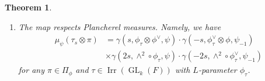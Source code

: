\documentclass[article]{article}
\numberwithin{equation}{section}
\newtheorem{theorem}{Theorem}[section]
\theoremstyle{definition}
\DeclareMathOperator{\GL}{GL}
\DeclareMathOperator{\Irr}{Irr}
\begin{document}
\begin{theorem}
\begin{enumerate}[(1).]
		$$
		\gamma(s,\pi,\chi,\psi)=\gamma(s,\phi\otimes\chi,\psi)
		$$
		for $\pi\in \Pi_{\phi}$ and any character $\chi$ of $F^{\times}$. 
		\item 
		The map respects Plancherel measures. Namely, we have 
		\begin{align*}
		\mu_{\psi}(\tau_s\otimes \pi)&=\gamma(s,\phi_{\tau}\otimes \phi^{ \vee},\psi)\cdot \gamma(-s,\phi_{\tau}^{\vee}\otimes\phi, \psi_{-1} )\\
		& \times \gamma (2s, \wedge^2\circ \phi_{\tau}, \psi)\cdot \gamma(-2s, \wedge^{2} \circ \phi_{\tau}^{\vee},\psi_{-1})
		\end{align*}
		for any $\pi\in \Pi_{\phi}$ and $\tau\in \Irr (\GL_k(F))$ with $L$-parameter $\phi_{\tau}$. 
	\end{enumerate}
\end{theorem}
\end{document}
